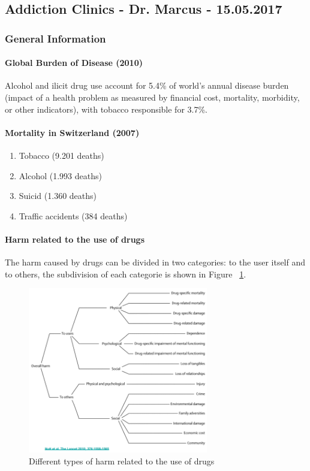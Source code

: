 \documentclass[12pt,article,oneside,a4paper]{memoir}
\begin{document}
\subsection{Addiction Clinics - Dr. Marcus - 15.05.2017}

\subsubsection{General Information}
\paragraph{Global Burden of Disease (2010)} Alcohol and ilicit drug use account for 5.4\% of world's annual disease burden (impact of a health problem as measured by financial cost, mortality, morbidity, or other indicators), with tobacco responsible for 3.7\%.

\paragraph{Mortality in Switzerland (2007)} 
\begin{enumerate}
\item Tobacco (9.201 deaths)
\item Alcohol (1.993 deaths)
\item Suicid (1.360 deaths)
\item Traffic accidents (384 deaths)
\end{enumerate}

\paragraph{Harm related to the use of drugs}
The harm caused by drugs can be divided in two categories: to the user itself and to others, the subdivision of each categorie is shown in Figure ~\ref{fig:harm-drugs}.

\begin{figure}
  \centering
  \includegraphics[width=0.7\textwidth]{imgs/harm-drugs.png}
  \caption{Different types of harm related to the use of drugs}
  \label{fig:harm-drugs}
\end{figure}
\end{document}
